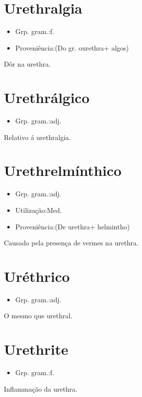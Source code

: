 \documentclass{article}
\begin{document}
\section{Urethralgia}
\begin{itemize}
\item {Grp. gram.:f.}
\end{itemize}
\begin{itemize}
\item {Proveniência:(Do gr. \textunderscore ourethra\textunderscore  + \textunderscore algos\textunderscore )}
\end{itemize}
Dôr na urethra.
\section{Urethrálgico}
\begin{itemize}
\item {Grp. gram.:adj.}
\end{itemize}
Relativo á urethralgia.
\section{Urethrelmínthico}
\begin{itemize}
\item {Grp. gram.:adj.}
\end{itemize}
\begin{itemize}
\item {Utilização:Med.}
\end{itemize}
\begin{itemize}
\item {Proveniência:(De \textunderscore urethra\textunderscore  + \textunderscore helmintho\textunderscore )}
\end{itemize}
Causado pela presença de vermes na urethra.
\section{Uréthrico}
\begin{itemize}
\item {Grp. gram.:adj.}
\end{itemize}
O mesmo que \textunderscore urethral\textunderscore .
\section{Urethrite}
\begin{itemize}
\item {Grp. gram.:f.}
\end{itemize}
Inflammação da urethra.
\end{document}
